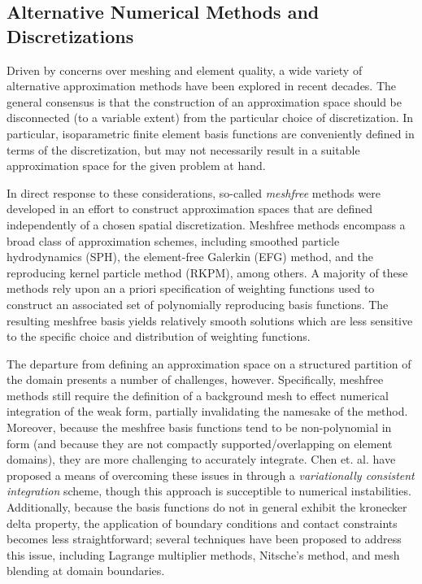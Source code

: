 	\subsection{Alternative Numerical Methods and Discretizations}
		Driven by concerns over meshing and element quality, a wide variety of alternative approximation methods have been explored in recent decades. The general consensus is that the construction of an approximation space should be disconnected (to a variable extent) from the particular choice of discretization. In particular, isoparametric finite element basis functions are conveniently defined in terms of the discretization, but may not necessarily result in a suitable approximation space for the given problem at hand.
		
		In direct response to these considerations, so-called \textit{meshfree} methods were developed in an effort to construct approximation spaces that are defined independently of a chosen spatial discretization. Meshfree methods encompass a broad class of approximation schemes, including smoothed particle hydrodynamics (SPH), the element-free Galerkin (EFG) method, and the reproducing kernel particle method (RKPM), among others. A majority of these methods rely upon an a priori specification of weighting functions used to construct an associated set of polynomially reproducing basis functions. The resulting meshfree basis yields relatively smooth solutions which are less sensitive to the specific choice and distribution of weighting functions.
		
		The departure from defining an approximation space on a structured partition of the domain presents a number of challenges, however. Specifically, meshfree methods still require the definition of a background mesh to effect numerical integration of the weak form, partially invalidating the namesake of the method. Moreover, because the meshfree basis functions tend to be non-polynomial in form (and because they are not compactly supported/overlapping on element domains), they are more challenging to accurately integrate. Chen et. al. have proposed a means of overcoming these issues in \cite{Chen:13} through a \textit{variationally consistent integration} scheme, though this approach is succeptible to numerical instabilities. Additionally, because the basis functions do not in general exhibit the kronecker delta property, the application of boundary conditions and contact constraints becomes less straightforward; several techniques have been proposed to address this issue, including Lagrange multiplier methods, Nitsche's method, and mesh blending at domain boundaries.
			
